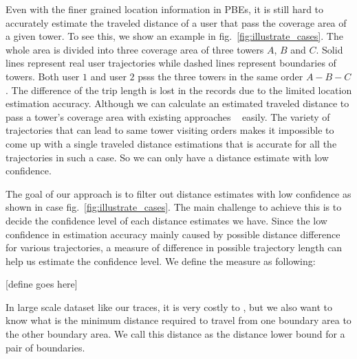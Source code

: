 Even with the finer grained location information in PBEs, it is still hard to accurately estimate the traveled distance of a user that pass the coverage area of a given tower. To see this, we show an example in fig.~\ref{fig:illustrate_cases}. The whole area is divided into three coverage area of three towers $A$, $B$ and $C$. Solid lines represent real user trajectories while dashed lines represent boundaries of towers. Both user $1$ and user $2$ psss the three towers in the same order $A - B - C$. The difference of the trip length is lost in the records due to the limited location estimation accuracy. Although we can calculate an estimated traveled distance to pass a tower's coverage area with existing approaches ~\cite{smoreda2013spatiotemporal, hoteit2014estimating, widhalm2015discovering, Alsolami2012Auth, jiang2013review, doyle2011utilising, bekhor2015investigation} easily. The variety of trajectories that can lead to same tower visiting orders makes it impossible to come up with a single traveled distance estimations that is accurate for all the trajectories in such a case. So we can only have a distance estimate with low confidence. 

The goal of our approach is to filter out distance estimates with low confidence as shown in case fig.~\ref{fig:illustrate_cases}. The main challenge to achieve this is to decide the confidence level of each distance estimates we have. Since the low confidence in estimation accuracy mainly caused by possible distance difference for various trajectories, a measure of difference in possible trajectory length can help us estimate the confidence level. We define the measure as following:

[define goes here]

In large scale dataset like our traces, it is very costly to , but we also want to know what is the minimum distance required to travel from one boundary area to the other boundary area. We call this distance as the distance lower bound for a pair of boundaries. 

